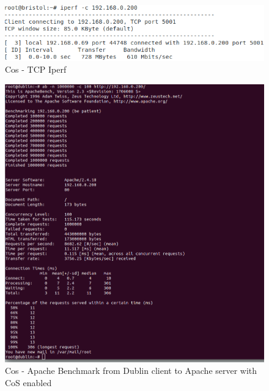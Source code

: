 \documentclass{article}
\begin{document}

\begin{figure}[H]
\includegraphics[width=14cm]{figures/q3-1-1.png}
\centering
\caption{Cos - TCP Iperf}
\centering
\label{fig:throughput_scenario_3}
\end{figure}


\begin{figure}[H]
\centering
\includegraphics[width=14cm]{figures/dublin-ab2.png}
\caption{Cos - Apache Benchmark from Dublin client to Apache server with CoS enabled}
\centering
\label{fig:ab2_calais_scenario_3}
\end{figure}
\end{document}
